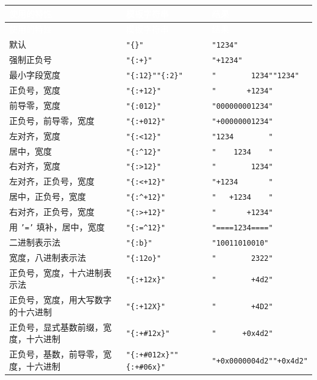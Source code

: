 \myTableBegin
\begin{xltabular}{\textwidth}{@{}>{\hsize\raggedright\arraybackslash}X>{\hsize\raggedright\arraybackslash}X>{\hsize\raggedright\arraybackslash}X@{}}
\textcolor{white}{使用的特性} & \textcolor{white}{模板字符串} & \textcolor{white}{结果} \\
\endfirsthead
{}\textcolor{white}{使用的特性} & \textcolor{white}{模板字符串} & \textcolor{white}{结果} \\
\endhead
默认 & \texttt{"\{\}"} & \texttt{"1234"} \\
强制正负号 & \texttt{"\{:+\}"} & \texttt{"+1234"} \\
最小字段宽度 & \texttt{"\{:12\}"}\newline{}\texttt{"\{:2\}"} & \texttt{"        1234"}\newline{}\texttt{"1234"} \\
正负号，宽度 & \texttt{"\{:+12\}"} & \texttt{"       +1234"} \\
前导零，宽度 & \texttt{"\{:012\}"} & \texttt{"000000001234"} \\
正负号，前导零，宽度 & \texttt{"\{:+012\}"} & \texttt{"+00000001234"} \\
左对齐，宽度 & \texttt{"\{:<12\}"} & \texttt{"1234        "} \\
居中，宽度 & \texttt{"\{:\textasciicircum{}12\}"} & \texttt{"    1234    "} \\
右对齐，宽度 & \texttt{"\{:>12\}"} & \texttt{"        1234"} \\
左对齐，正负号，宽度 & \texttt{"\{:<+12\}"} & \texttt{"+1234       "} \\
居中，正负号，宽度 & \texttt{"\{:\textasciicircum{}+12\}"} & \texttt{"   +1234    "} \\
右对齐，正负号，宽度 & \texttt{"\{:>+12\}"} & \texttt{"       +1234"} \\
用 \texttt{'='} 填补，居中，宽度 & \texttt{"\{:=\textasciicircum{}12\}"} & \texttt{"====1234===="} \\
二进制表示法 & \texttt{"\{:b\}"} & \texttt{"10011010010"} \\
宽度，八进制表示法 & \texttt{"\{:12o\}"} & \texttt{"        2322"} \\
正负号，宽度，十六进制表示法 & \texttt{"\{:+12x\}"} & \texttt{"        +4d2"} \\
正负号，宽度，用大写数字的十六进制 & \texttt{"\{:+12X\}"} & \texttt{"        +4D2"} \\
正负号，显式基数前缀，宽度，十六进制 & \texttt{"\{:+\#12x\}"} & \texttt{"      +0x4d2"} \\
正负号，基数，前导零，宽度，十六进制 & \texttt{"\{:+\#012x\}"}\newline{}\texttt{"\{:+\#06x\}"} & \texttt{"+0x0000004d2"}\newline{}\texttt{"+0x4d2"} \\
\end{xltabular}
\myTableEnd

